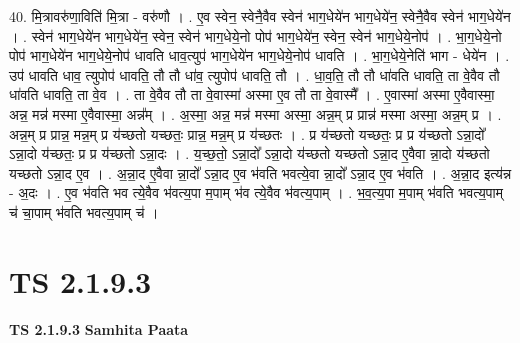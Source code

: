 \documentclass[17pt]{extarticle}
\begin{document}
40. मि॒त्रावरु॑णा॒विति॑ मि॒त्रा - वरु॑णौ । . ए॒व स्वेन॒ स्वेनै॒वैव स्वेन॑ भाग॒धेये॑न भाग॒धेये॑न॒ स्वेनै॒वैव स्वेन॑ भाग॒धेये॑न । . स्वेन॑ भाग॒धेये॑न भाग॒धेये॑न॒ स्वेन॒ स्वेन॑ भाग॒धेये॒नो पोप॑ भाग॒धेये॑न॒ स्वेन॒ स्वेन॑ भाग॒धेये॒नोप॑ । . भा॒ग॒धेये॒नो पोप॑ भाग॒धेये॑न भाग॒धेये॒नोप॑ धावति धाव॒त्युप॑ भाग॒धेये॑न भाग॒धेये॒नोप॑ धावति । . भा॒ग॒धेये॒नेति॑ भाग - धेये॑न । . उप॑ धावति धाव॒ त्युपोप॑ धावति॒ तौ तौ धा॑व॒ त्युपोप॑ धावति॒ तौ । . धा॒व॒ति॒ तौ तौ धा॑वति धावति॒ ता वे॒वैव तौ धा॑वति धावति॒ ता वे॒व । . ता वे॒वैव तौ ता वे॒वास्मा॑ अस्मा ए॒व तौ ता वे॒वास्मै᳚ । . ए॒वास्मा॑ अस्मा ए॒वैवास्मा॒ अन्न॒ मन्न॑ मस्मा ए॒वैवास्मा॒ अन्न᳚म् । . अ॒स्मा॒ अन्न॒ मन्न॑ मस्मा अस्मा॒ अन्न॒म् प्र प्रान्न॑ मस्मा अस्मा॒ अन्न॒म् प्र । . अन्न॒म् प्र प्रान्न॒ मन्न॒म् प्र य॑च्छतो यच्छतः॒ प्रान्न॒ मन्न॒म् प्र य॑च्छतः । . प्र य॑च्छतो यच्छतः॒ प्र प्र य॑च्छतो ऽन्ना॒दो᳚ ऽन्ना॒दो य॑च्छतः॒ प्र प्र य॑च्छतो ऽन्ना॒दः । . य॒च्छ॒तो॒ ऽन्ना॒दो᳚ ऽन्ना॒दो य॑च्छतो यच्छतो ऽन्ना॒द ए॒वैवा न्ना॒दो य॑च्छतो यच्छतो ऽन्ना॒द ए॒व । . अ॒न्ना॒द ए॒वैवा न्ना॒दो᳚ ऽन्ना॒द ए॒व भ॑वति भवत्ये॒वा न्ना॒दो᳚ ऽन्ना॒द ए॒व भ॑वति । . अ॒न्ना॒द इत्य॑न्न - अ॒दः । . ए॒व भ॑वति भव त्ये॒वैव भ॑वत्य॒पा म॒पाम् भ॑व त्ये॒वैव भ॑वत्य॒पाम् । . भ॒व॒त्य॒पा म॒पाम् भ॑वति भवत्य॒पाम् च॑ चा॒पाम् भ॑वति भवत्य॒पाम् च॑ । \newline
\pagebreak
{}
\section*{ TS 2.1.9.3 }

\textbf{TS 2.1.9.3 } \newline
\textbf{Samhita Paata} \newline
\end{document}
